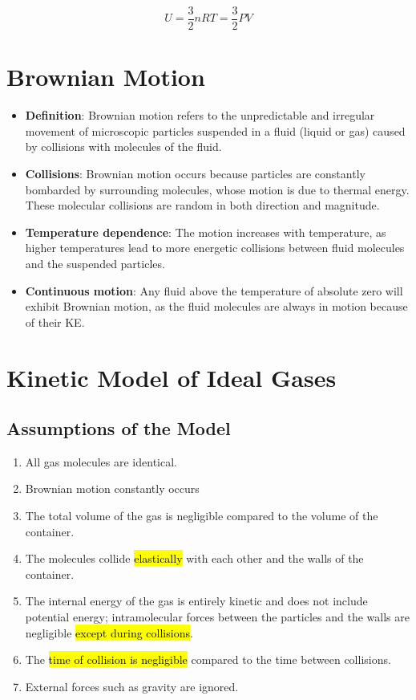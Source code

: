 \documentclass[a4paper,12pt]{article}
\let\oldsection\section
\renewcommand\section{\clearpage\oldsection}
\begin{document}
$$U = \frac{3}{2}nRT = \frac{3}{2}PV$$

\section{Brownian Motion}

\begin{itemize}
  \item \textbf{Definition}: Brownian motion refers to the unpredictable and irregular movement of microscopic particles suspended in a fluid (liquid or gas) caused by collisions with molecules of the fluid.
  \item \textbf{Collisions}: Brownian motion occurs because particles are constantly bombarded by surrounding molecules, whose motion is due to thermal energy. These molecular collisions are random in both direction and magnitude.
  \item \textbf{Temperature dependence}: The motion increases with temperature, as higher temperatures lead to more energetic collisions between fluid molecules and the suspended particles.
  \item \textbf{Continuous motion}: Any fluid above the temperature of absolute zero will exhibit Brownian motion, as the fluid molecules are always in motion because of their KE.
\end{itemize}

\section{Kinetic Model of Ideal Gases}

\subsection{Assumptions of the Model}

\begin{enumerate}
  \item All gas molecules are identical.
  \item Brownian motion constantly occurs
  \item The total volume of the gas is negligible compared to the volume of the container.
  \item The molecules collide \hl{elastically} with each other and the walls of the container.
  \item The internal energy of the gas is entirely kinetic and does not include potential energy; intramolecular forces between the particles and the walls are negligible \hl{except during collisions}.
  \item The \hl{time of collision is negligible} compared to the time between collisions.
  \item External forces such as gravity are ignored.
\end{enumerate}
\end{document}
